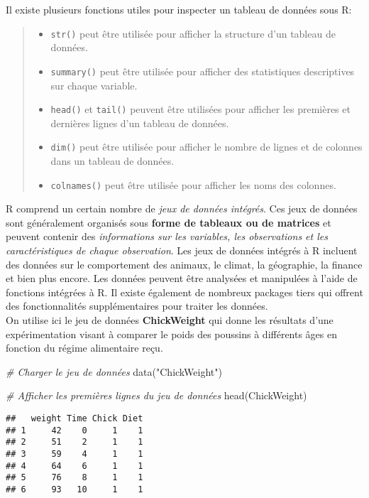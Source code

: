 \documentclass[
]{article}
\newenvironment{Shaded}{\begin{snugshade}}{\end{snugshade}}
\newcommand{\CommentTok}[1]{\textcolor[rgb]{0.56,0.35,0.01}{\textit{#1}}}
\newcommand{\FunctionTok}[1]{\textcolor[rgb]{0.00,0.00,0.00}{#1}}
\newcommand{\NormalTok}[1]{#1}
\newcommand{\StringTok}[1]{\textcolor[rgb]{0.31,0.60,0.02}{#1}}
\providecommand{\tightlist}{%
  \setlength{\itemsep}{0pt}\setlength{\parskip}{0pt}}
\begin{document}
Il existe plusieurs fonctions utiles pour inspecter un tableau de données sous R:

\begin{quote}
\begin{itemize}
\tightlist
\item
  \texttt{str()} peut être utilisée pour afficher la structure d'un tableau de données.
\item
  \texttt{summary()} peut être utilisée pour afficher des statistiques descriptives sur chaque variable.
\item
  \texttt{head()} et \texttt{tail()} peuvent être utilisées pour afficher les premières et dernières lignes d'un tableau de données.
\item
  \texttt{dim()} peut être utilisée pour afficher le nombre de lignes et de colonnes dans un tableau de données.
\item
  \texttt{colnames()} peut être utilisée pour afficher les noms des colonnes.
\end{itemize}
\end{quote}

R comprend un certain nombre de \emph{jeux de données intégrés}. Ces jeux de données sont généralement organisés sous \textbf{forme de tableaux ou de matrices} et peuvent contenir des \emph{informations sur les variables, les observations et les caractéristiques de chaque observation}. Les jeux de données intégrés à R incluent des données sur le comportement des animaux, le climat, la géographie, la finance et bien plus encore. Les données peuvent être analysées et manipulées à l'aide de fonctions intégrées à R. Il existe également de nombreux packages tiers qui offrent des fonctionnalités supplémentaires pour traiter les données.\\
On utilise ici le jeu de données \textbf{ChickWeight} qui donne les résultats d'une expérimentation visant à comparer le poids des poussins à différents âges en fonction du régime alimentaire reçu.

\begin{Shaded}
\begin{Highlighting}[]
\CommentTok{\# Charger le jeu de données}
\FunctionTok{data}\NormalTok{(}\StringTok{"ChickWeight"}\NormalTok{)}

\CommentTok{\# Afficher les premières lignes du jeu de données}
\FunctionTok{head}\NormalTok{(ChickWeight)}
\end{Highlighting}
\end{Shaded}

\begin{verbatim}
##   weight Time Chick Diet
## 1     42    0     1    1
## 2     51    2     1    1
## 3     59    4     1    1
## 4     64    6     1    1
## 5     76    8     1    1
## 6     93   10     1    1
\end{verbatim}
\end{document}
